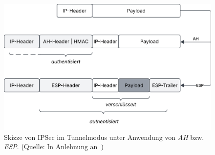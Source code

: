 \begin{figure}
    \centering
    \includegraphics[scale=0.4]{aufgabe 3/img/tunnelmodus.svg}
    \caption{Skizze von IPSec im Tunnelmodus unter Anwendung von \textit{AH} bzw. \textit{ESP}. (Quelle: In Anlehnung an~\cite[\textbf{Abb. 3.6}, 41]{ITS4})}
    \label{fig:tunnelmodus}
\end{figure}